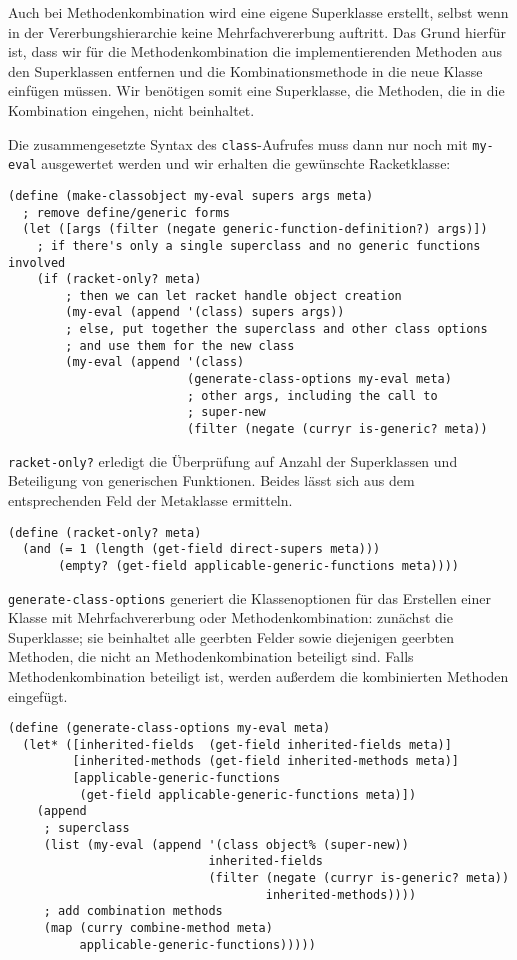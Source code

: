 Auch bei Methodenkombination wird eine eigene Superklasse erstellt, selbst wenn in der Vererbungshierarchie keine Mehrfachvererbung auftritt. Das Grund hierfür ist, dass wir für die Methodenkombination die implementierenden Methoden aus den Superklassen entfernen und die Kombinationsmethode in die neue Klasse einfügen müssen. Wir benötigen somit eine Superklasse, die Methoden, die in die Kombination eingehen, nicht beinhaltet.

Die zusammengesetzte Syntax des \texttt{class}-Aufrufes muss dann nur noch mit \texttt{my-eval} ausgewertet werden und wir erhalten die gewünschte Racketklasse:

\begin{lstlisting}
(define (make-classobject my-eval supers args meta)
  ; remove define/generic forms
  (let ([args (filter (negate generic-function-definition?) args)])
    ; if there's only a single superclass and no generic functions involved
    (if (racket-only? meta)
        ; then we can let racket handle object creation
        (my-eval (append '(class) supers args))
        ; else, put together the superclass and other class options
        ; and use them for the new class
        (my-eval (append '(class)
                         (generate-class-options my-eval meta)
                         ; other args, including the call to
                         ; super-new
                         (filter (negate (curryr is-generic? meta)) 
\end{lstlisting}

\texttt{racket-only?} erledigt die Überprüfung auf Anzahl der Superklassen und Beteiligung von generischen Funktionen. Beides lässt sich aus dem entsprechenden Feld der Metaklasse ermitteln. 

\begin{lstlisting}
(define (racket-only? meta)
  (and (= 1 (length (get-field direct-supers meta)))
       (empty? (get-field applicable-generic-functions meta))))
\end{lstlisting}

\texttt{generate-class-options} generiert die Klassenoptionen für das Erstellen einer Klasse mit Mehrfachvererbung oder Methodenkombination: zunächst die Superklasse; sie beinhaltet alle geerbten Felder sowie diejenigen geerbten Methoden, die nicht an Methodenkombination beteiligt sind. Falls Methodenkombination beteiligt ist, werden außerdem die kombinierten Methoden eingefügt.

\begin{lstlisting}
(define (generate-class-options my-eval meta)
  (let* ([inherited-fields  (get-field inherited-fields meta)]
         [inherited-methods (get-field inherited-methods meta)]
         [applicable-generic-functions 
          (get-field applicable-generic-functions meta)])
    (append
     ; superclass
     (list (my-eval (append '(class object% (super-new))
                            inherited-fields
                            (filter (negate (curryr is-generic? meta))
                                    inherited-methods))))
     ; add combination methods
     (map (curry combine-method meta)
          applicable-generic-functions)))))
\end{lstlisting}

